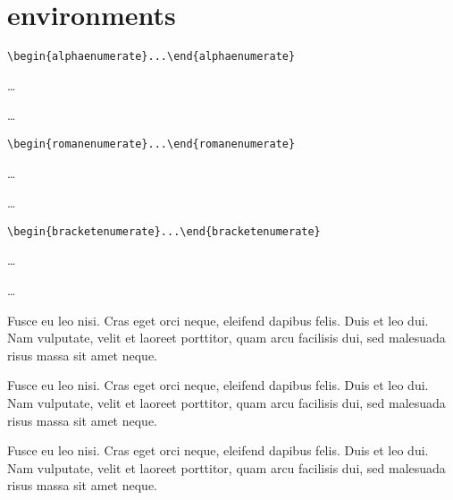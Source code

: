 \documentclass[a4paper,UKenglish,numberwithinsect,cleveref,thm-restate]{lipics-v2021}
\theoremstyle{plain}
\begin{document}



\appendix


\section{environments}

\begin{alphaenumerate}
\item \verb|\begin{alphaenumerate}...\end{alphaenumerate}|
\item \dots
\item \dots
\end{alphaenumerate}

\begin{romanenumerate}
\item \verb|\begin{romanenumerate}...\end{romanenumerate}|
\item \dots
\item \dots
\end{romanenumerate}

\begin{bracketenumerate}
\item \verb|\begin{bracketenumerate}...\end{bracketenumerate}|
\item \dots
\item \dots
\end{bracketenumerate}


\begin{note}\label{testenv-note}
Fusce eu leo nisi. Cras eget orci neque, eleifend dapibus felis. Duis et leo dui. Nam vulputate, velit et laoreet porttitor, quam arcu facilisis dui, sed malesuada risus massa sit amet neque.
\end{note}

\begin{claim}\label{testenv-claim}
Fusce eu leo nisi. Cras eget orci neque, eleifend dapibus felis. Duis et leo dui. Nam vulputate, velit et laoreet porttitor, quam arcu facilisis dui, sed malesuada risus massa sit amet neque.
\end{claim}


\begin{claimproof}
Fusce eu leo nisi. Cras eget orci neque, eleifend dapibus felis. Duis et leo dui. Nam vulputate, velit et laoreet porttitor, quam arcu facilisis dui, sed malesuada risus massa sit amet neque.
\end{claimproof}
\end{document}

